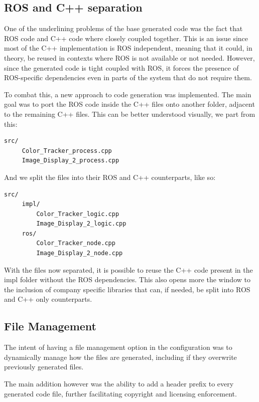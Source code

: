 \subsection{ROS and C++ separation}
\label{sec:impl_ros_separation}

One of the underlining problems of the base generated code was the fact that \gls{ROS} code and C++ code where closely coupled together. This is an issue since most of the C++ implementation is \gls{ROS} independent, meaning that it could, in theory, be reused in contexts where \gls{ROS} is not available or not needed. However, since the generated code is tight coupled with \gls{ROS}, it forces the presence of ROS-specific dependencies even in parts of the system that do not require them. 

To combat this, a new approach to code generation was implemented. The main goal was to port the \gls{ROS} code inside the C++ files onto another folder, adjacent to the remaining C++ files. This can be better understood visually, we part from this:

\begin{verbatim}
src/
	 Color_Tracker_process.cpp
	 Image_Display_2_process.cpp
\end{verbatim}


And we split the files into their \gls{ROS} and C++ counterparts, like so:

\begin{verbatim}
src/
	 impl/
		 Color_Tracker_logic.cpp
		 Image_Display_2_logic.cpp
	 ros/
		 Color_Tracker_node.cpp
		 Image_Display_2_node.cpp
\end{verbatim}

With the files now separated, it is possible to reuse the C++ code present in the impl folder without the \gls{ROS} dependencies. This also opens more the window to the inclusion of company specific libraries that can, if needed, be split into \gls{ROS} and C++ only counterparts.


\subsection{File Management}
\label{sec:impl_file_mng}

The intent of having a file management option in the configuration was to dynamically manage how the files are generated, including if they overwrite previously generated files.

The main addition however was the ability to add a header prefix to every generated code file, further facilitating copyright and licensing enforcement.

